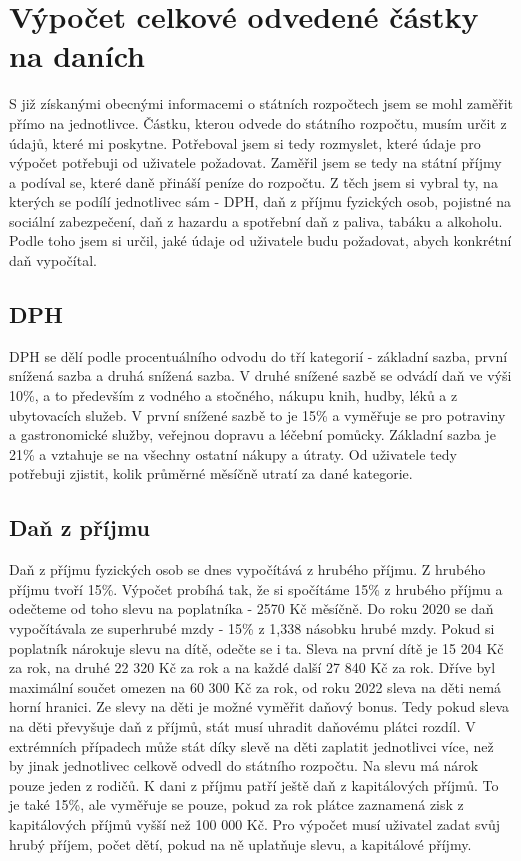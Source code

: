 \documentclass[11pt,a4paper,twoside,openright]{report}
\begin{document}
\section{Výpočet celkové odvedené částky na daních}

S již získanými obecnými informacemi o státních rozpočtech jsem se mohl zaměřit přímo na jednotlivce. Částku, kterou odvede do státního rozpočtu, musím určit z údajů, které mi poskytne. Potřeboval jsem si tedy rozmyslet, které údaje pro výpočet potřebuji od uživatele požadovat. Zaměřil jsem se tedy na státní příjmy a podíval se, které daně přináší peníze do rozpočtu. Z těch jsem si vybral ty, na kterých se podílí jednotlivec sám - DPH, daň z příjmu fyzických osob, pojistné na sociální zabezpečení, daň z hazardu a spotřební daň z paliva, tabáku a alkoholu. Podle toho jsem si určil, jaké údaje od uživatele budu požadovat, abych konkrétní daň vypočítal.

\subsection{DPH}

DPH se dělí podle procentuálního odvodu do tří kategorií - základní sazba, první snížená sazba a druhá snížená sazba. V druhé snížené sazbě se odvádí daň ve výši 10\%, a to především z vodného a stočného, nákupu knih, hudby, léků a z ubytovacích služeb. V první snížené sazbě to je 15\% a vyměřuje se pro potraviny a gastronomické služby, veřejnou dopravu a léčební pomůcky. Základní sazba je 21\% a vztahuje se na všechny ostatní nákupy a útraty. Od uživatele tedy potřebuji zjistit, kolik průměrné měsíčně utratí za dané kategorie.

\subsection{Daň z příjmu}

Daň z příjmu fyzických osob se dnes vypočítává z hrubého příjmu. Z hrubého příjmu tvoří 15\%. Výpočet probíhá tak, že si spočítáme 15\% z hrubého příjmu a odečteme od toho slevu na poplatníka - 2570 Kč měsíčně. Do roku 2020 se daň vypočítávala ze superhrubé mzdy - 15\% z 1,338 násobku hrubé mzdy. Pokud si poplatník nárokuje slevu na dítě, odečte se i ta. Sleva na první dítě je 15 204 Kč za rok, na druhé 22 320 Kč za rok a na každé další 27 840 Kč za rok. Dříve byl maximální součet omezen na 60 300 Kč za rok, od roku 2022 sleva na děti nemá horní hranici. Ze slevy na děti je možné vyměřit daňový bonus. Tedy pokud sleva na děti převyšuje daň z příjmů, stát musí uhradit daňovému plátci rozdíl. V extrémních případech může stát díky slevě na děti zaplatit jednotlivci více, než by jinak jednotlivec celkově odvedl do státního rozpočtu. Na slevu má nárok pouze jeden z rodičů. K dani z příjmu patří ještě daň z kapitálových příjmů. To je také 15\%, ale vyměřuje se pouze, pokud za rok plátce zaznamená zisk z kapitálových příjmů vyšší než 100 000 Kč. Pro výpočet musí uživatel zadat svůj hrubý příjem, počet dětí, pokud na ně uplatňuje slevu, a kapitálové příjmy.
\end{document}
